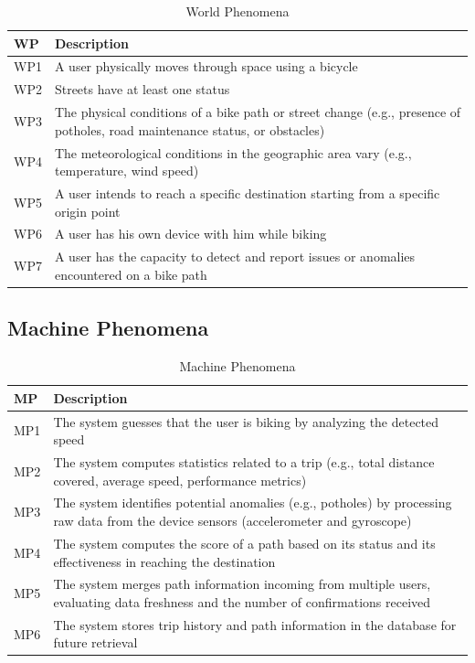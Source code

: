 \begin{table}[H]
\centering
\begin{tabularx}{\linewidth}{|l|X|}
\hline
\textbf{WP} & \textbf{Description} \\ \hline
WP1 & A user physically moves through space using a bicycle \\ \hline
WP2 & Streets have at least one status \\ \hline
WP3 & The physical conditions of a bike path or street change (e.g., presence of potholes, road maintenance status, or obstacles) \\ \hline
WP4 & The meteorological conditions in the geographic area vary (e.g., temperature, wind speed) \\ \hline
WP5 & A user intends to reach a specific destination starting from a specific origin point \\ \hline
WP6 & A user has his own device with him while biking \\ \hline
WP7 & A user has the capacity to detect and report issues or anomalies encountered on a bike path \\ \hline
\end{tabularx}
\caption{World Phenomena}
\label{tab:world-phenomena}
\end{table}


\subsection{Machine Phenomena}
\begin{table}[H]
\centering
\begin{tabularx}{\linewidth}{|l|X|}
\hline
\textbf{MP} & \textbf{Description} \\ \hline
MP1 & The system guesses that the user is biking by analyzing the detected speed \\ \hline
MP2 & The system computes statistics related to a trip (e.g., total distance covered, average speed, performance metrics) \\ \hline
MP3 & The system identifies potential anomalies (e.g., potholes) by processing raw data from the device sensors (accelerometer and gyroscope) \\ \hline
MP4 & The system computes the score of a path based on its status and its effectiveness in reaching the destination \\ \hline
MP5 & The system merges path information incoming from multiple users, evaluating data freshness and the number of confirmations received \\ \hline
MP6 & The system stores trip history and path information in the database for future retrieval \\ \hline
\end{tabularx}
\caption{Machine Phenomena}
\label{tab:machine-phenomena}
\end{table}


